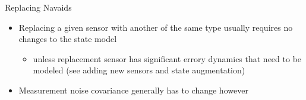 \begin{frame}
Replacing Navaids
 \begin{itemize}
 \item Replacing a given sensor with another of the same type usually requires no changes to the state model
	\begin{itemize}
		\item unless replacement sensor has significant errory dynamics that need to be modeled (see adding new sensors and state augmentation)
	\end{itemize}
 \item Measurement noise covariance generally has to change however
\end{itemize}
\end{frame}
